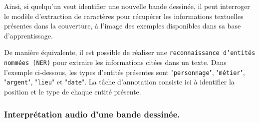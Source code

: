 			Ainsi, si quelqu'un veut identifier une nouvelle bande dessinée, il peut interroger le modèle d'extraction de caractères pour récupérer les informations textuelles présentes dans la couverture, à l'image des exemples disponibles dans sa base d'apprentissage.
			
			\setcounter{localCounterOfFootnoteValue}{\value{footnote}}
			\begin{leftBarInformation}
				De manière équivalente, il est possible de réaliser une \texttt{reconnaissance d'entités nommées (\texttt{NER})} \footnotemark pour extraire les informations citées dans un texte.
				Dans l'exemple ci-dessous, les types d'entités présentes sont "\texttt{personnage}", "\texttt{métier}", "\texttt{argent}", "\texttt{lieu}" et "\texttt{date}".
				La tâche d'annotation consiste ici à identifier la position et le type de chaque entité présente.
				
				\begin{quote}
				\end{quote}
			\end{leftBarInformation}
		
		
		\subsubsection{Interprétation audio d'une bande dessinée.}
		\label{section:2.1.2.D-PRESENTATION-ANNOTATION-EXEMPLES-TRANSCRIPTION}
		
